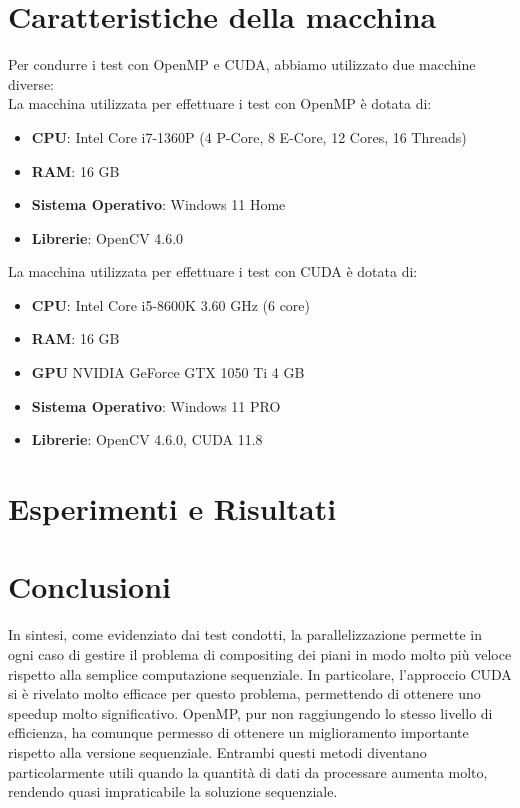 \documentclass[11pt]{article}
\begin{document}
    \section{Caratteristiche della macchina}\label{sec:caratteristiche-della-macchina}
    Per condurre i test con OpenMP e CUDA, abbiamo utilizzato due macchine diverse:\\
    La macchina utilizzata per effettuare i test con OpenMP è dotata di:
    \begin{itemize}
        \item \textbf{CPU}: Intel Core i7-1360P (4 P-Core, 8 E-Core, 12 Cores, 16 Threads)
        \item \textbf{RAM}: 16 GB
        \item \textbf{Sistema Operativo}: Windows 11 Home
        \item \textbf{Librerie}: OpenCV 4.6.0
    \end{itemize}

    La macchina utilizzata per effettuare i test con CUDA è dotata di:
    \begin{itemize}
        \item \textbf{CPU}: Intel Core i5-8600K 3.60 GHz (6 core)
        \item \textbf{RAM}: 16 GB
        \item \textbf{GPU} NVIDIA GeForce GTX 1050 Ti 4 GB
        \item \textbf{Sistema Operativo}: Windows 11 PRO
        \item \textbf{Librerie}: OpenCV 4.6.0, CUDA 11.8
    \end{itemize}

    \section{Esperimenti e Risultati}\label{sec:tests}
    

    \section{Conclusioni}\label{sec:conclusioni}
    In sintesi, come evidenziato dai test condotti, la parallelizzazione permette in ogni caso di gestire il problema
    di compositing dei piani in modo molto più veloce rispetto alla semplice computazione sequenziale.
    In particolare, l'approccio CUDA si è rivelato molto efficace per questo problema, permettendo di ottenere uno
    speedup molto significativo.
    OpenMP, pur non raggiungendo lo stesso livello di efficienza, ha comunque permesso di ottenere un miglioramento
    importante rispetto alla versione sequenziale.
    Entrambi questi metodi diventano particolarmente utili quando la quantità di dati da processare aumenta molto,
    rendendo quasi impraticabile la soluzione sequenziale.

    \clearpage

    \appendix
    
\end{document}
